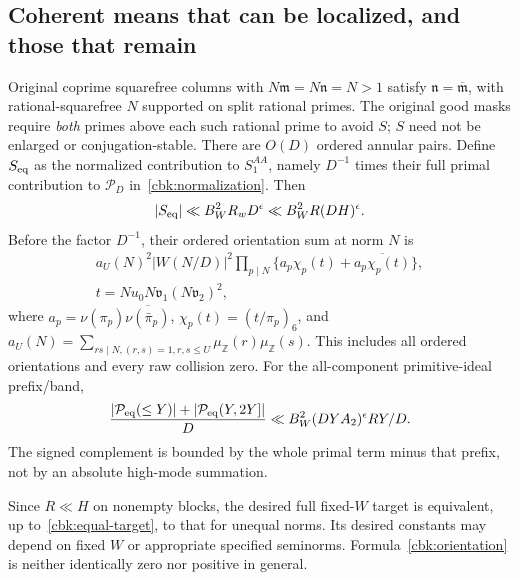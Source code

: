 \subsection{Coherent means that can be localized, and those that remain}
\label{cbk:localization}
\begin{proposition}
\label{cbk:equal}
Original coprime squarefree columns with
$N\mathfrak m=N\mathfrak n=N>1$ satisfy
$\mathfrak n=\overline{\mathfrak m}$, with rational-squarefree $N$
supported on split rational primes. The original good masks require
\emph{both} primes above each such rational prime to avoid $S$;
$S$ need not be enlarged or conjugation-stable. There are $O(D)$
ordered annular pairs. Define $S_{\rm eq}$ as the normalized contribution to $S_1^{AA}$,
namely $D^{-1}$ times their full primal contribution to $\mathcal P_D$
in~\eqref{cbk:normalization}. Then
\begin{equation}\label{cbk:equal-target}
 |S_{\rm eq}|\ll B_W^2R_wD^\epsilon\ll B_W^2R(DH)^\epsilon.
\end{equation}
Before the factor $D^{-1}$, their ordered orientation sum at norm $N$ is
\begin{equation}\label{cbk:orientation}
 \begin{gathered}
 a_U(N)^2|W(N/D)|^2
   \prod_{p\mid N}\{a_p\chi_p(t)+\overline{a_p\chi_p(t)}\},\\
 t=Nu_0N\mathfrak v_1(N\mathfrak v_2)^2,
 \end{gathered}
\end{equation}
where $a_p=\nu(\pi_p)\overline{\nu(\bar\pi_p)}$,
$\chi_p(t)=(t/\pi_p)_6$, and
$a_U(N)=\sum_{rs\mid N,(r,s)=1,r,s\le U}\mu_{\mathbb Z}(r)\mu_{\mathbb Z}(s)$.
This includes all ordered orientations and every raw collision zero.
For the all-component primitive-ideal prefix/band,
\begin{equation}\label{cbk:equal-prefix}
 \frac{|\mathcal P_{\rm eq}(\le Y)|+
             |\mathcal P_{\rm eq}(Y,2Y]|}{D}
       \ll B_W^2(DYA_2)^\epsilon RY/D.
\end{equation}
The signed complement is bounded by the whole primal term minus that
prefix, not by an absolute high-mode summation.
\end{proposition}
Since $R\ll H$ on nonempty blocks, the desired full fixed-$W$ target
is equivalent, up to~\eqref{cbk:equal-target}, to that for unequal
norms. Its desired constants may depend on fixed $W$ or appropriate
specified seminorms. Formula~\eqref{cbk:orientation} is neither
identically zero nor positive in general.

